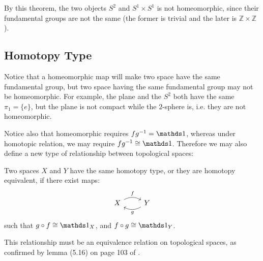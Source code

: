 \begin{fact}
By this theorem, the two objects $S^2$ and $S^1\times S^1$ is not
homeomorphic, since their fundamental groups are not the same (the
former is trivial and the later is $\mathbb{Z}\times\mathbb{Z}$).
\end{fact}


\subsection{Homotopy Type}
\label{sec:Homotopy-Type}

Notice that a homeomorphic map will make two space have the same
fundamental group, but two space having the same fundamental group may
not be homeomorphic. For example, the plane and the $S^2$ both have
the same $\pi_1=\{e\}$, but the plane is not compact while the
$2$-sphere is, i.e. they are not homeomorphic.

Notice also that homeomorphic requires $fg^{-1}=\id$, whereas under
homotopic relation, we may require $fg^{-1}\cong\id$. Therefore we may
also define a new type of relationship between topological spaces:

\begin{defi}
    Two spaces $X$ and $Y$ have the same homotopy type, or they are
    homotopy equivalent, if there exist maps:
    $$ \begin{tikzcd}[]
        X\ar[r,"f",bend left] & Y\ar[l,"g",bend left]
    \end{tikzcd}$$
    such that $g\circ f\cong \id_X$, and $f\circ g\cong\id_Y$.
\end{defi}
\begin{fact}
This relationship must be an equivalence relation on topological
spaces, as confirmed by lemma (5.16) on page 103 of \cite{book}.
\end{fact}

